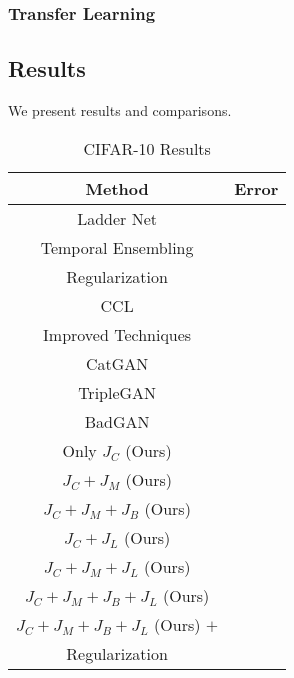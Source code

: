 \subsubsection{Transfer Learning}


\subsection{Results}
We present results and comparisons.

\begin{table}
	\centering
	\begin{tabular}{|c|c|}
		\hline
		\textbf{Method} & \textbf{Error} \\
		\hline
		Ladder Net \cite{Rasmus2015} & \\
		\hline
		Temporal Ensembling \cite{Laine2016}  & \\
		\hline
		Regularization \cite{Sajjadi2016a}  & \\
		\hline
		CCL \cite{Kamnitsas2018}  & \\
		\hline
		Improved Techniques \cite{Salimans2016}  & \\
		\hline
		CatGAN \cite{Springenberg2015}  & \\
		\hline
		TripleGAN \cite{Li2017}  & \\
		\hline
		BadGAN \cite{Dai2017}  & \\
		\hline
		\hline
		Only $J_C$ (Ours)  & \\
		\hline
		$J_C + J_M$ (Ours)  & \\
		\hline
		$J_C + J_M + J_B$ (Ours)  & \\
		\hline
		$J_C + J_L$ (Ours)  & \\
		\hline
		$J_C + J_M + J_L$ (Ours)  & \\
		\hline
		$J_C + J_M + J_B + J_L$ (Ours)  & \\
		\hline
		$J_C + J_M + J_B + J_L$ (Ours) $+$  & \\
		Regularization  & \\
		\hline
	\end{tabular}
	\caption{CIFAR-10 Results}
	\label{tab:cifar_results}
\end{table}





